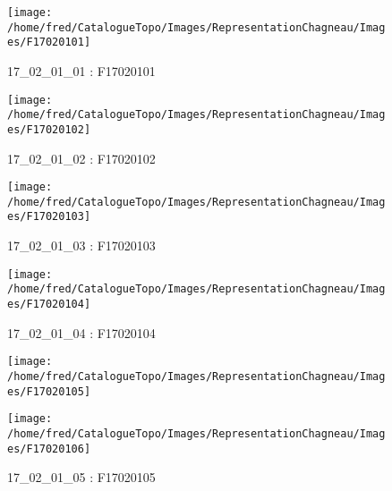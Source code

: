 \documentclass[12pt,titlepage,oneside]{book}
\begin{document}
\begin{figure}[h!]
  \hfill         %
  \begin{minipage}[t]{3cm}
    \begin{center}
      \texttt{[image: /home/fred/CatalogueTopo/Images/RepresentationChagneau/Images/F17020101]}
      \caption[F17020101]{\label{} 17\_02\_01\_01 : F17020101}
    \end{center}
  \end{minipage}
  \begin{minipage}[t]{3cm}
    \begin{center}
      \texttt{[image: /home/fred/CatalogueTopo/Images/RepresentationChagneau/Images/F17020102]}
      \caption[F17020102]{\label{} 17\_02\_01\_02 : F17020102}
    \end{center}
  \end{minipage}
  \begin{minipage}[t]{3cm}
    \begin{center}
      \texttt{[image: /home/fred/CatalogueTopo/Images/RepresentationChagneau/Images/F17020103]}
      \caption[F17020103]{\label{} 17\_02\_01\_03 : F17020103}
    \end{center}
  \end{minipage}
  \begin{minipage}[t]{3cm}
    \begin{center}
      \texttt{[image: /home/fred/CatalogueTopo/Images/RepresentationChagneau/Images/F17020104]}
      \caption[F17020104]{\label{} 17\_02\_01\_04 : F17020104}
    \end{center}
  \end{minipage}
  \begin{minipage}[t]{3cm}
    \begin{center}
      \texttt{[image: /home/fred/CatalogueTopo/Images/RepresentationChagneau/Images/F17020105]}
      \caption[F17020105]{\label{} 17\_02\_01\_05 : F17020105}
    \end{center}
  \end{minipage}
  \begin{minipage}[t]{3cm}
    \begin{center}
      \texttt{[image: /home/fred/CatalogueTopo/Images/RepresentationChagneau/Images/F17020106]}

\end{center}
\end{minipage}
\end{figure}
\end{document}
